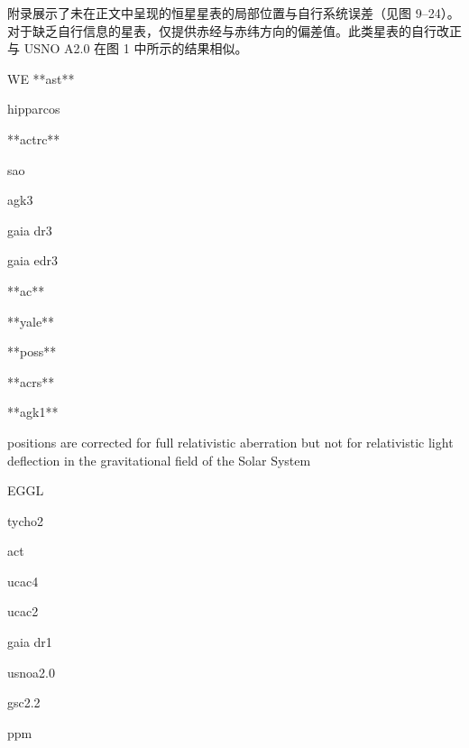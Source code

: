 附录展示了未在正文中呈现的恒星星表的局部位置与自行系统误差（见图 9–24）。对于缺乏自行信息的星表，仅提供赤经与赤纬方向的偏差值。此类星表的自行改正与 USNO A2.0 在图 1 中所示的结果相似。







WE
**ast**

hipparcos

**actrc**

sao

agk3

gaia dr3

gaia edr3

**ac**

**yale**

**poss**

**acrs**

**agk1**

positions are corrected for full relativistic aberration but not for relativistic light deflection in the gravitational field of the Solar System



EGGL

tycho2

act

ucac4

ucac2

gaia dr1

usnoa2.0

gsc2.2

ppm